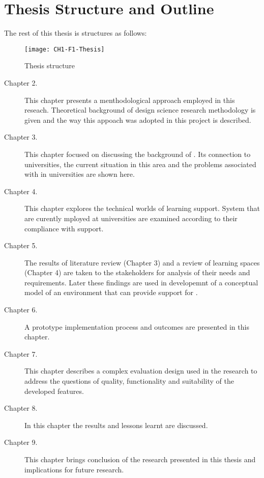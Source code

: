 \section{Thesis Structure and Outline}

The rest of this thesis is structures as follows:

\begin{figure}[htb]
\centering
\texttt{[image: CH1-F1-Thesis]}
\caption{Thesis structure}
\label{fig:ts}
\end{figure}

\begin{description}
\item[Chapter 2.] This chapter presents a menthodological approach employed in
this reseach. Theoretical background of design science research methodology is
given and the way this appoach was adopted in this project is described.
\item[Chapter 3.] This chapter focused on discussing the background of \LLLsn.
Its connection to universities, the current situation in this area and the
problems associated with \LLLs in universities are shown here.
\item[Chapter 4.] This chapter explores the technical worlds of learning
support. System that are curently mployed at universities are examined according
to their compliance with \LLLs support.
\item[Chapter 5.] The results of literature review (Chapter 3) and a review of
learning spaces (Chapter 4) are taken to the stakeholders for analysis of their
needs and requirements. Later these findings are used in developemnt of a conceptual model
of an environment that can provide support for \LLLsn.
\item[Chapter 6.] A prototype implementation process and outcomes are presented
in this chapter.
\item[Chapter 7.] This chapter describes a complex evaluation design used in the
research to address the questions of quality, functionality and suitability of
the developed features.
\item[Chapter 8.] In this chapter the results and lessons learnt are discussed.
\item[Chapter 9.] This chapter brings conclusion of the research presented in
this thesis and implications for future research.
\end{description}